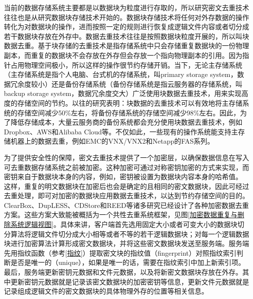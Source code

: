 \documentclass[promaster]{thesis-uestc}
\begin{document}
当前的数据存储系统主要都是以数据块为粒度进行存取的，所以研究密文去重技术往往也是从研究数据块存储技术开始的。数据块存储技术将任何对外存数据的操作转化为对数据块的操作，进而按照一定的规则进行恢复成逻辑文件内容或者切分成若干数据块存放在外存中。数据去重技术往往是按照数据块粒度开展的，所以叫块数据去重。基于块存储的去重技术是指存储系统中只会存储重复数据块的一份物理副本，而重复的数据块不会存放在外存但会存放一个指向物理副本的引用。因为指针占用物理空间极小，所以这样的操作很节约存储开销。当下，无论主存储系统（主存储系统是指个人电脑、台式机的存储系统，叫primary storage system，数据冗余度较小）还是备份存储系统（备份存储系统是指云服务器的存储系统，叫backup storage system，数据冗余度交大）广泛使用块数据去重技术，用来实现高度的存储空间的节约。以往的研究表明：块数据的去重技术可以有效地将主存储系统的存储空间减少50$\%$左右，将备份存储系统的存储空间减少98$\%$左右。因此，为了降低存储成本，大量云服务商的备份系统都会充分使用块数据去重技术，例如Dropbox、AWS和Alibaba Cloud等。不仅如此，一些现有的操作系统能支持主存储机器上的数据去重，例如EMC的VNX/VNX2和Netapp的FAS系列。

为了提供安全性的保障，密文去重技术提供了一个加密层，以确保数据信息在写入可去重数据存储系统之前被加密。这种加密可通过对称密钥加密的方式来实现，而密钥来自于数据块本身的内容，例如，密钥被设置为数据块内容本身的哈希值。
这样，重复的明文数据块在加密后也会是确定的且相同的密文数据块，因此可经过去重处理，即可对加密的数据块应用数据去重技术，以达到节约存储空间的目的。ClearBox、DupLESS、CDStore和REED等诸多研究已经设计了各种加密数据去重方案。这些方案大致能被概括为一个共性去重系统框架，见图\ref{加密数据重复与删除系统逻辑视图}。具体来讲，客户端首先选用固定大小或者可变大小的数据块切分算法将逻辑文件切分成大小相等或者不等的若干逻辑数据块；对每一个逻辑数据块进行加密算法计算形成密文数据块，并将这些密文数据块发送至服务端。服务端先用指纹函数（参考\ref{指纹}）提取密文块的指纹值（fingerprint）对照指纹索引判断是否是唯一的（unique），如果是唯一的话，需要在指纹索引中加上新索引项。最后，服务端更新密钥元数据和文件元数据，以及将新密文数据块存放在外存。其中更新密钥元数据就是记录该密文数据块的加密密钥等信息，更新文件元数据就是记录组成逻辑文件的密文数据块的具体物理外存的位置等相关信息。
\end{document}
